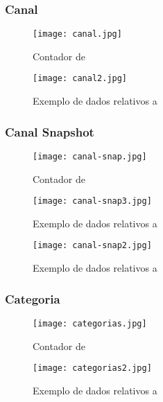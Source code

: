 \subsubsection{Canal}

\begin{figure}[H]
  \centering
  \begin{minipage}[b]{0.25\textwidth}
      \centering
      \texttt{[image: canal.jpg]}
      \caption{Contador de }
  \end{minipage}
  \hspace{0.05\textwidth}
  \begin{minipage}[b]{0.6\textwidth}
      \centering
      \texttt{[image: canal2.jpg]}
      \caption{Exemplo de dados relativos a }
  \end{minipage}
\end{figure}

\subsubsection{Canal Snapshot}

\begin{figure}[H]
  \centering
  \begin{minipage}[b]{0.25\textwidth}
      \centering
      \texttt{[image: canal-snap.jpg]}
      \caption{Contador de }
  \end{minipage}
  \hspace{0.05\textwidth}
  \begin{minipage}[b]{0.6\textwidth}
      \centering
      \texttt{[image: canal-snap3.jpg]}
      \caption{Exemplo de dados relativos a }
  \end{minipage}
\end{figure}

\begin{figure}[H]
  \centering
  \texttt{[image: canal-snap2.jpg]}
  \caption{Exemplo de dados relativos a }
\end{figure}

\subsubsection{Categoria}

\begin{figure}[H]
  \centering
  \begin{minipage}[b]{0.25\textwidth}
      \centering
      \texttt{[image: categorias.jpg]}
      \caption{Contador de }
  \end{minipage}
  \hspace{0.05\textwidth}
  \begin{minipage}[b]{0.6\textwidth}
      \centering
      \texttt{[image: categorias2.jpg]}
      \caption{Exemplo de dados relativos a }
  \end{minipage}
\end{figure}

